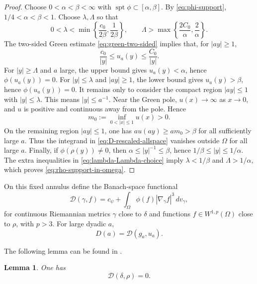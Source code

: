 \documentclass[11pt]{amsart}
\numberwithin{equation}{section}
\newtheorem{lemma}[theorem]{Lemma}
\theoremstyle{definition}
\newcommand{\spt}{\operatorname{spt}}
\newcommand{\Dfun}{\mathscr D}
\newcommand{\rhoE}{\rho}
\newcommand{\abs}[1]{\left\lvert #1\right\rvert}
\begin{document}
\begin{proof}
Choose $0<\alpha<\beta<\infty$ with $\spt\phi\subset[\alpha,\beta]$. By \eqref{eq:phi-support}, $1/4<\alpha<\beta<1$. Choose $\lambda,\Lambda$ so that
\begin{equation}\label{eq:lambda-Lambda-choice}
        0<\lambda<\min\left\{\frac{c_0}{2\beta},\frac1{2\beta}\right\},
        \qquad
        \Lambda>\max\left\{\frac{2C_0}{\alpha},\frac2{\alpha}\right\}.
\end{equation}
The two-sided Green estimate \eqref{eq:green-two-sided} implies that, for $\abs{ay}\ge1$,
$$
        \frac{c_0}{\abs y}\le u_a(y)\le \frac{C_0}{\abs y}.
$$
For $\abs y\ge\Lambda$ and $a$ large, the upper bound gives $u_a(y)<\alpha$, hence $\phi(u_a(y))=0$. For $\abs y\le\lambda$ and $\abs{ay}\ge1$, the lower bound gives $u_a(y)>\beta$, hence $\phi(u_a(y))=0$. It remains only to consider the compact region $\abs{ay}\le1$ with $\abs y\le\lambda$. This means $\abs y\le a^{-1}$. Near the Green pole, $u(x)\to\infty$ as $x\to0$, and $u$ is positive and continuous away from the pole. Hence
$$
        m_0:=\inf_{0<\abs x\le1}u(x)>0.
$$
On the remaining region $\abs{ay}\le1$, one has $a u(ay)\ge a m_0>\beta$ for all sufficiently large $a$. Thus the integrand in \eqref{eq:D-rescaled-allspace} vanishes outside $\Omega$ for all large $a$. Finally, if $\phi(\rhoE(y))\ne0$, then $\alpha\le |y|^{-1}\le\beta$, hence $1/\beta\le |y|\le 1/\alpha$. The extra inequalities in \eqref{eq:lambda-Lambda-choice} imply $\lambda<1/\beta$ and $\Lambda>1/\alpha$, which proves \eqref{eq:rho-support-in-omega}.
\end{proof}

On this fixed annulus define the Banach-space functional
\begin{equation}\label{eq:Dfun-def}
        \Dfun(\gamma,f)=c_\psi+\int_\Omega\phi(f)\abs{\nabla_\gamma f}^3\,dv_\gamma,
\end{equation}
for continuous Riemannian metrics $\gamma$ close to $\delta$ and functions $f\in W^{1,p}(\Omega)$ close to $\rhoE$, with $p>3$.  For large dyadic $a$,
$$
        D(a)=\Dfun(g_a,u_a).
$$

The following lemma can be found in \cite[Proposition 16]{MYrigidity}.
\begin{lemma}\label{lem:euclidean-calibration}
One has
\begin{equation}\label{eq:D-euclidean-zero}
        \Dfun(\delta,\rhoE)=0.
\end{equation}
\end{lemma}
\end{document}
